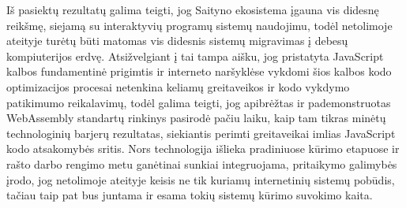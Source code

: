 \documentclass{VUMIFPSkursinis}
\begin{document}
\begin{nopagebreak}
Iš pasiektų rezultatų galima teigti, jog Saityno ekosistema įgauna vis didesnę reikšmę, siejamą su interaktyvių programų sistemų naudojimu, todėl netolimoje ateityje turėtų būti matomas vis didesnis sistemų migravimas į debesų kompiuterijos erdvę. Atsižvelgiant į tai tampa aišku, jog pristatyta JavaScript kalbos fundamentinė prigimtis ir interneto naršyklėse vykdomi šios kalbos kodo optimizacijos procesai netenkina keliamų greitaveikos ir kodo vykdymo patikimumo reikalavimų, todėl galima teigti, jog apibrėžtas ir pademonstruotas WebAssembly standartų rinkinys pasirodė pačiu laiku, kaip tam tikras minėtų technologinių barjerų rezultatas, siekiantis perimti greitaveikai imlias JavaScript kodo atsakomybės sritis. Nors technologija išlieka pradiniuose kūrimo etapuose ir rašto darbo rengimo metu ganėtinai sunkiai integruojama, pritaikymo galimybės įrodo, jog netolimoje ateityje keisis ne tik kuriamų internetinių sistemų pobūdis, tačiau taip pat bus juntama ir esama tokių sistemų kūrimo suvokimo kaita.

\end{nopagebreak}
\printbibliography[heading=bibintoc, title=Šaltiniai]  %
\end{document}
